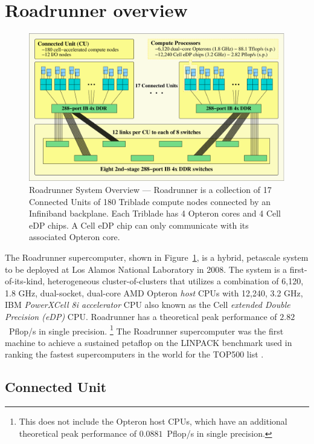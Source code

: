 \documentclass[journal,twoside]{IEEEtran}
\newcommand{\fig}[1]{Figure~\ref{fig:#1}}
\begin{document}
\section{Roadrunner overview}

\begin{figure}
\begin{center}
\includegraphics[width=7in]{figs/system.eps}
\caption{Roadrunner System Overview --- Roadrunner is a collection
of 17 Connected Units of 180 Triblade compute nodes connected by an
Infiniband backplane.  Each Triblade has 4 Opteron cores and 4 Cell
eDP chips.  A Cell eDP chip can only communicate with its associated
Opteron core.}
\label{fig:system}
\end{center}
\end{figure}

The Roadrunner supercomputer, shown in \fig{system}, is a hybrid,
petascale system to be deployed at Los Alamos National Laboratory in
2008.  The system is a first-of-its-kind, heterogeneous
cluster-of-clusters that utilizes a combination of 6,120, 1.8 GHz,
dual-socket, dual-core AMD Opteron \emph{host} CPUs with 12,240, 3.2
GHz, IBM \emph{PowerXCell 8i accelerator} CPU also known as the Cell
\emph{extended Double Precision (eDP)} CPU.  Roadrunner has a
theoretical peak performance of $2.82$~Pflop/s in single precision.
\footnote{This does not include the Opteron host CPUs, which have
an additional theoretical peak performance of $0.0881$~Pflop/s in
single precision.}
The Roadrunner supercomputer was the first machine to achieve a
sustained petaflop on the LINPACK benchmark used in ranking the
fastest supercomputers in the world for the TOP500 list
\cite{top500}.

\subsection{Connected Unit}
\end{document}
